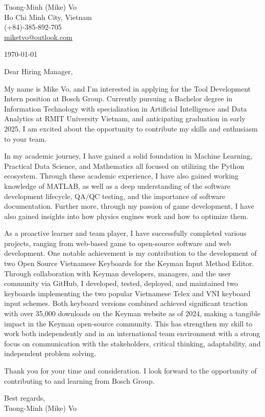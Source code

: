 \documentclass[a4paper,11pt]{article}
\makeatletter
\newcommand{\header}{
    \small{
        Tuong-Minh (Mike) Vo\\
        Ho Chi Minh City, Vietnam\\
        (+84)-385-892-705\\
        \href{miketvo@outlook.com}{miketvo@outlook.com}
    }
    \par\noindent\hrulefill
}
\newcommand{\p}[1]{#1\\\vspace{6pt}}
\makeatother
\begin{document}
\header

\p{\today}

\p{Dear Hiring Manager,}

\p{My name is Mike Vo, and I'm interested in applying for the Tool Development Intern position at Bosch Group. Currently pursuing a Bachelor degree in Information Technology with specialization in Artificial Intelligence and Data Analytics at RMIT University Vietnam, and anticipating graduation in early 2025, I am excited about the opportunity to contribute my skills and enthusiasm to your team.}

\p{In my academic journey, I have gained a solid foundation in Machine Learning, Practical Data Science, and Mathematics all focused on utilizing the Python ecosystem. Through these academic experience, I have also gained working knowledge of MATLAB, as well as a deep understanding of the software development lifecycle, QA/QC testing, and the importance of software documentation. Further more, through my passion of game development, I have also gained insights into how physics engines work and how to optimize them.}

\p{As a proactive learner and team player, I have successfully completed various projects, ranging from web-based game to open-source software and web development. One notable achievement is my contribution to the development of two Open Source Vietnamese Keyboards for the Keyman Input Method Editor. Through collaboration with Keyman developers, managers, and the user community via GitHub, I developed, tested, deployed, and maintained two keyboards implementing the two popular Vietnamese Telex and VNI keyboard input schemes. Both keyboard versions combined achieved significant traction with over 35,000 downloads on the Keyman website as of 2024, making a tangible impact in the Keyman open-source community. This has strengthen my skill to work both independently and in an international team environment with a strong focus on communication with the stakeholders, critical thinking, adaptability, and independent problem solving.}

\p{Thank you for your time and consideration. I look forward to the opportunity of contributing to and learning from Bosch Group.}

\p{Best regards,\\
Tuong-Minh (Mike) Vo}
\end{document}
